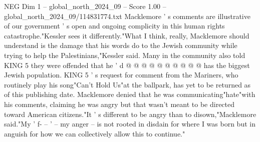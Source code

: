 \begin{textsample}{NEG Dim 1 – global\_north\_2024\_09 – Score 1.00 – global\_north\_2024\_09/114831774.txt}
Macklemore ' s comments are illustrative of our government ' s open and ongoing complicity in this human rights catastrophe."Kessler sees it differently."What I think, really, Macklemore should understand is the damage that his words do to the Jewish community while trying to help the Palestinians,"Kessler said.
Many in the community also told KING 5 they were offended that he ' d @ @ @ @ @ @ @ @ @ @ has the biggest Jewish population.
KING 5 ' s request for comment from the Mariners, who routinely play his song"Can't Hold Us"at the ballpark, has yet to be returned as of this publishing date.
Macklemore denied that he was communicating"hate"with his comments, claiming he was angry but that wasn't meant to be directed toward American citizens."It ' s different to be angry than to disown,"Macklemore said."My ' f- -- ' -- my anger -- is not rooted in disdain for where I was born but in anguish for how we can collectively allow this to continue."

\end{textsample}
